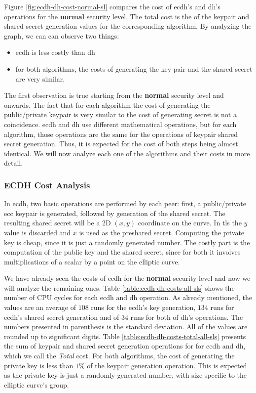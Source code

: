 \documentclass{llncs}
\begin{document}
Figure \ref{fig:ecdh-dh-cost-normal-sl} compares the cost of \gls{ecdh}'s and \gls{dh}'s operations for the \textbf{normal} security level.
The total cost is the of the keypair and shared secret generation values for the corresponding algorithm. By analyzing the graph, we can can
observe two things:

\begin{itemize}
  \item \gls{ecdh} is less costly than \gls{dh}
  \item for both algorithms, the costs of generating the key pair and the shared secret are very similar.
\end{itemize}

The first observation is true starting from the \textbf{normal} security level and onwards.
The fact that for each algorithm the cost of generating the public/private keypair is very similar to the cost of generating secret is not a coincidence.
\gls{ecdh} and \gls{dh} use different mathematical operations, but for each algorithm, those operations are the same for the operations of keypair
shared secret generation. Thus, it is expected for the cost of both steps being almost identical. We will now analyze each one of the algorithms and
their costs in more detail.

\subsubsection{ECDH Cost Analysis}

In \gls{ecdh}, two basic operations are performed by each peer: first, a public/private \gls{ecc} keypair is generated, followed by generation of
the shared secret. The resulting shared secret will be a 2D $(x,y)$ coordinate on the curve. In \gls{tls} the $y$ value is discarded and $x$ is
used as the preshared secret. Computing the private key is cheap, since it is just a randomly generated number. The costly part is the computation of
the public key and the shared secret, since for both it involves multiplications of a scalar by a point on the elliptic curve.

We have already seen the costs of \gls{ecdh} for the \textbf{normal} security level and now we will analyze the remaining ones. Table
\ref{table:ecdh-dh-costs-all-sls} shows the number of CPU cycles for each \gls{ecdh} and \gls{dh} operation. As already mentioned, the values are
an average of $108$ runs for the \gls{ecdh}'s key generation, $134$ runs for \gls{ecdh}'s shared secret generation and of $34$ runs for both of \gls{dh}'s
operations. The numbers presented in parenthesis is the standard deviation. All of the values are rounded up to significant digits.
Table \ref{table:ecdh-dh-costs-total-all-sls} presents the sum of keypair and shared secret generation operations for for \gls{ecdh} and \gls{dh},
which we call the \textit{Total} cost. For both algorithms, the cost of generating the private key is less than $1\%$ of the keypair generation operation.
This is expected as the private key is just a randomly generated number, with size specific to the elliptic curve's group.
\end{document}
